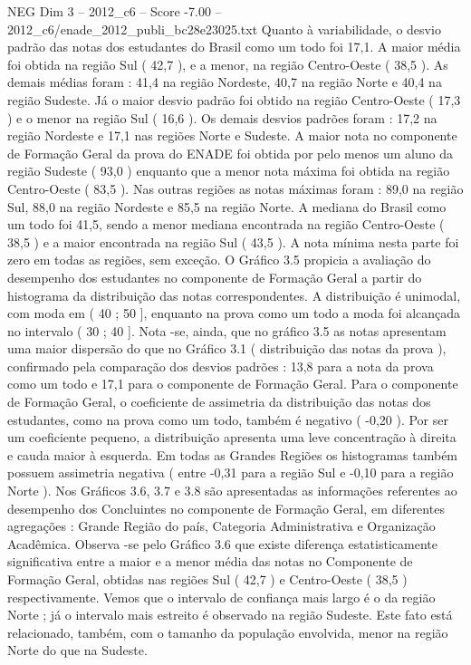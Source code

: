 \begin{textsample}{NEG Dim 3 – 2012\_c6 – Score -7.00 – 2012\_c6/enade\_2012\_publi\_bc28e23025.txt}
Quanto à variabilidade, o desvio padrão das notas dos estudantes do Brasil como um todo foi 17,1.
A maior média foi obtida na região Sul ( 42,7 ), e a menor, na região Centro-Oeste ( 38,5 ).
As demais médias foram : 41,4 na região Nordeste, 40,7 na região Norte e 40,4 na região Sudeste.
Já o maior desvio padrão foi obtido na região Centro-Oeste ( 17,3 ) e o menor na região Sul ( 16,6 ).
Os demais desvios padrões foram : 17,2 na região Nordeste e 17,1 nas regiões Norte e Sudeste.
A maior nota no componente de Formação Geral da prova do ENADE foi obtida por pelo menos um aluno da região Sudeste ( 93,0 ) enquanto que a menor nota máxima foi obtida na região Centro-Oeste ( 83,5 ).
Nas outras regiões as notas máximas foram : 89,0 na região Sul, 88,0 na região Nordeste e 85,5 na região Norte.
A mediana do Brasil como um todo foi 41,5, sendo a menor mediana encontrada na região Centro-Oeste ( 38,5 ) e a maior encontrada na região Sul ( 43,5 ).
A nota mínima nesta parte foi zero em todas as regiões, sem exceção.
O Gráfico 3.5 propicia a avaliação do desempenho dos estudantes no componente de Formação Geral a partir do histograma da distribuição das notas correspondentes.
A distribuição é unimodal, com moda em ( 40 ; 50 ], enquanto na prova como um todo a moda foi alcançada no intervalo ( 30 ; 40 ].
Nota -se, ainda, que no gráfico 3.5 as notas apresentam uma maior dispersão do que no Gráfico 3.1 ( distribuição das notas da prova ), confirmado pela comparação dos desvios padrões : 13,8 para a nota da prova como um todo e 17,1 para o componente de Formação Geral.
Para o componente de Formação Geral, o coeficiente de assimetria da distribuição das notas dos estudantes, como na prova como um todo, também é negativo ( -0,20 ).
Por ser um coeficiente pequeno, a distribuição apresenta uma leve concentração à direita e cauda maior à esquerda.
Em todas as Grandes Regiões os histogramas também possuem assimetria negativa ( entre -0,31 para a região Sul e -0,10 para a região Norte ).
Nos Gráficos 3.6, 3.7 e 3.8 são apresentadas as informações referentes ao desempenho dos Concluintes no componente de Formação Geral, em diferentes agregações : Grande Região do país, Categoria Administrativa e Organização Acadêmica.
Observa -se pelo Gráfico 3.6 que existe diferença estatisticamente significativa entre a maior e a menor média das notas no Componente de Formação Geral, obtidas nas regiões Sul ( 42,7 ) e Centro-Oeste ( 38,5 ) respectivamente.
Vemos que o intervalo de confiança mais largo é o da região Norte ; já o intervalo mais estreito é observado na região Sudeste.
Este fato está relacionado, também, com o tamanho da população envolvida, menor na região Norte do que na Sudeste.

\end{textsample}
